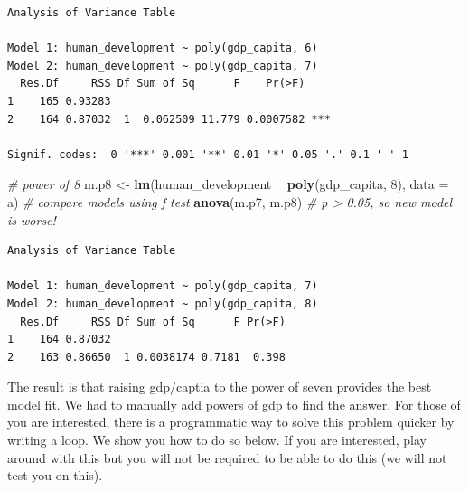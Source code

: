 \documentclass[]{article}
\newenvironment{Shaded}{\begin{snugshade}}{\end{snugshade}}
\newcommand{\KeywordTok}[1]{\textcolor[rgb]{0.13,0.29,0.53}{\textbf{#1}}}
\newcommand{\DataTypeTok}[1]{\textcolor[rgb]{0.13,0.29,0.53}{#1}}
\newcommand{\DecValTok}[1]{\textcolor[rgb]{0.00,0.00,0.81}{#1}}
\newcommand{\StringTok}[1]{\textcolor[rgb]{0.31,0.60,0.02}{#1}}
\newcommand{\CommentTok}[1]{\textcolor[rgb]{0.56,0.35,0.01}{\textit{#1}}}
\newcommand{\OperatorTok}[1]{\textcolor[rgb]{0.81,0.36,0.00}{\textbf{#1}}}
\newcommand{\NormalTok}[1]{#1}
\theoremstyle{definition}
\theoremstyle{definition}
\theoremstyle{definition}
\theoremstyle{remark}
\begin{document}
\begin{verbatim}
Analysis of Variance Table

Model 1: human_development ~ poly(gdp_capita, 6)
Model 2: human_development ~ poly(gdp_capita, 7)
  Res.Df     RSS Df Sum of Sq      F    Pr(>F)    
1    165 0.93283                                  
2    164 0.87032  1  0.062509 11.779 0.0007582 ***
---
Signif. codes:  0 '***' 0.001 '**' 0.01 '*' 0.05 '.' 0.1 ' ' 1
\end{verbatim}

\begin{Shaded}
\begin{Highlighting}[]
\CommentTok{# power of 8}
\NormalTok{m.p8 <-}\StringTok{ }\KeywordTok{lm}\NormalTok{(human_development }\OperatorTok{~}\StringTok{ }\KeywordTok{poly}\NormalTok{(gdp_capita, }\DecValTok{8}\NormalTok{), }\DataTypeTok{data =}\NormalTok{ a)}
\CommentTok{# compare models using f test}
\KeywordTok{anova}\NormalTok{(m.p7, m.p8) }\CommentTok{# p > 0.05, so new model is worse!}
\end{Highlighting}
\end{Shaded}

\begin{verbatim}
Analysis of Variance Table

Model 1: human_development ~ poly(gdp_capita, 7)
Model 2: human_development ~ poly(gdp_capita, 8)
  Res.Df     RSS Df Sum of Sq      F Pr(>F)
1    164 0.87032                           
2    163 0.86650  1 0.0038174 0.7181  0.398
\end{verbatim}

The result is that raising gdp/captia to the power of seven provides the
best model fit. We had to manually add powers of gdp to find the answer.
For those of you are interested, there is a programmatic way to solve
this problem quicker by writing a loop. We show you how to do so below.
If you are interested, play around with this but you will not be
required to be able to do this (we will not test you on this).
\end{document}

